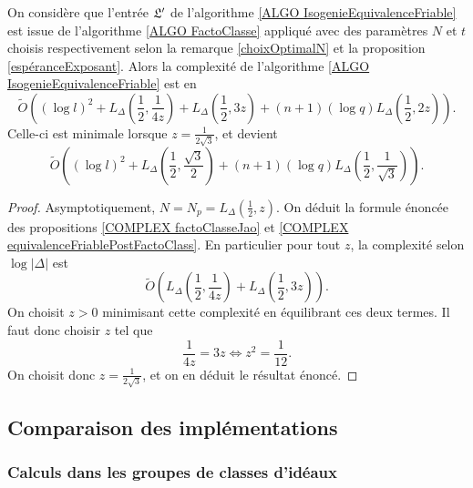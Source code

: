 \begin{Coro}
	On considère que l'entrée $\mathfrak{L}'$ de l'algorithme \ref{ALGO IsogenieEquivalenceFriable} est issue de l'algorithme \ref{ALGO FactoClasse} appliqué avec des paramètres $N$ et $t$ choisis respectivement selon la remarque \ref{choixOptimalN} et la proposition \ref{espéranceExposant}. Alors la complexité de l'algorithme \ref{ALGO IsogenieEquivalenceFriable} est en
	\begin{equation*}
		\tilde{O}\left( (\log l)^2 + L_\Delta\left(\frac{1}{2}, \frac{1}{4z}\right) + L_\Delta\left(\frac{1}{2}, 3z\right) + \left( n+1\right) \left( \log q\right)L_\Delta\left( \frac{1}{2}, 2z\right) \right).
	\end{equation*}
	Celle-ci est minimale lorsque $z = \frac{1}{2\sqrt{3}}$, et devient
	\begin{equation*}
		\tilde{O}\left( (\log l)^2 + L_\Delta\left(\frac{1}{2}, \frac{\sqrt{3}}{2}\right) + \left( n + 1\right) \left( \log q\right) L_\Delta\left( \frac{1}{2}, \frac{1}{\sqrt{3}}\right)  \right).
	\end{equation*}
\end{Coro}

\begin{proof}
	
	Asymptotiquement, $N = N_p = L_\Delta\left(\frac{1}{2}, z \right)$. On déduit la formule énoncée des propositions \ref{COMPLEX factoClasseJao} et \ref{COMPLEX equivalenceFriablePostFactoClass}. En particulier pour tout $z$, la complexité selon $\log|\Delta|$ est
	\begin{equation*}
		\tilde{O}\left( L_\Delta\left(\frac{1}{2}, \frac{1}{4z} \right) + L_\Delta\left(\frac{1}{2}, 3z \right) \right). 
	\end{equation*}
	On choisit $z > 0$ minimisant cette complexité en équilibrant ces deux termes. Il faut donc choisir $z$ tel que
	\begin{equation*}
		\frac{1}{4z} = 3z \iff z^2 = \frac{1}{12}.
	\end{equation*}
	On choisit donc $z = \frac{1}{2\sqrt{3}}$, et on en déduit le résultat énoncé. 
	
\end{proof}

\subsection{Comparaison des implémentations}
\label{SECTION BrokerExpériences}

\subsubsection{Calculs dans les groupes de classes d'idéaux}


